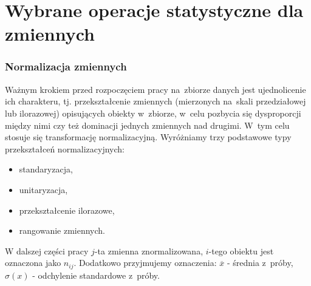 \documentclass[12pt,a4paper]{report}
\begin{document}
\section{Wybrane operacje statystyczne dla zmiennych}\label{wybrane_operacje_statystyczne}
\subsubsection{Normalizacja zmiennych}
Ważnym krokiem przed rozpoczęciem pracy na~zbiorze danych jest ujednolicenie ich charakteru, tj. przekształcenie zmiennych (mierzonych na~skali przedziałowej lub ilorazowej) opisujących obiekty w~zbiorze, w~celu pozbycia się dysproporcji między nimi czy też dominacji jednych zmiennych nad drugimi. W~tym celu stosuje się transformację normalizacyjną. Wyróżniamy trzy podstawowe typy przekształceń normalizacyjnych:
\begin{itemize}
\item standaryzacja,
\item unitaryzacja,
\item przekształcenie ilorazowe,
\item rangowanie zmiennych.
\end{itemize}
W dalszej części pracy $j$-ta zmienna znormalizowana, $i$-tego obiektu jest oznaczona jako $n_{ij}$. Dodatkowo przyjmujemy oznaczenia: $\overline{x}$ - średnia z~próby, $\sigma{(x)}$ - odchylenie standardowe z~próby.
\end{document}
